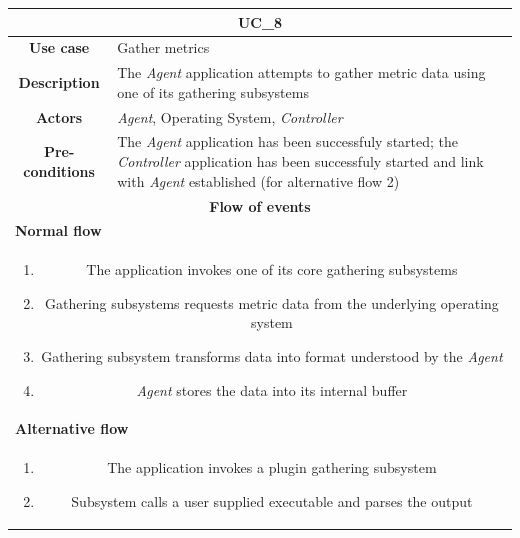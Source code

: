 \documentclass[12pt,a4paper,table]{article}
\begin{document}
            \vspace{0.5cm}
            \noindent
            \begin{longtable}{ |c|p{11.8cm}| }
                \hline
                \multicolumn{2}{|c|}{\cellcolor{lime} \textbf{UC\_8}}\\ \hline
                \cellcolor[gray]{0.9} \textbf{Use case} & Gather metrics\\ \hline
                \cellcolor[gray]{0.9} \textbf{Description} & The \textit{Agent} application attempts to gather metric data using one of its gathering subsystems\\ \hline
                \cellcolor[gray]{0.9} \textbf{Actors} & \textit{Agent}, Operating System, \textit{Controller}\\ \hline
                \cellcolor[gray]{0.9} \textbf{Pre-conditions} & The \textit{Agent} application has been successfuly started; the \textit{Controller} application has been successfuly started and link with \textit{Agent} established (for alternative flow 2)\\ \hline
                \multicolumn{2}{|c|}{\cellcolor[gray]{0.9} \textbf{Flow of events}}\\ \hline
                \multicolumn{2}{|l|}{\cellcolor[gray]{0.9} \textbf{Normal flow}}\\ \hline
                \multicolumn{2}{|p{14cm}|}{
                    \begin{enumerate}
                        \item The application invokes one of its core gathering subsystems
                        \item Gathering subsystems requests metric data from the underlying operating system
                        \item Gathering subsystem transforms data into format understood by the \textit{Agent}
                        \item \textit{Agent} stores the data into its internal buffer
                    \end{enumerate}
                }\\ \hline
                \multicolumn{2}{|l|}{\cellcolor[gray]{0.9} \textbf{Alternative flow}}\\ \hline
                \multicolumn{2}{|p{14cm}|}{
                    \begin{enumerate}
                        \item The application invokes a plugin gathering subsystem
                        \item Subsystem calls a user supplied executable and parses the output

\end{enumerate}}
\end{longtable}
\end{document}
